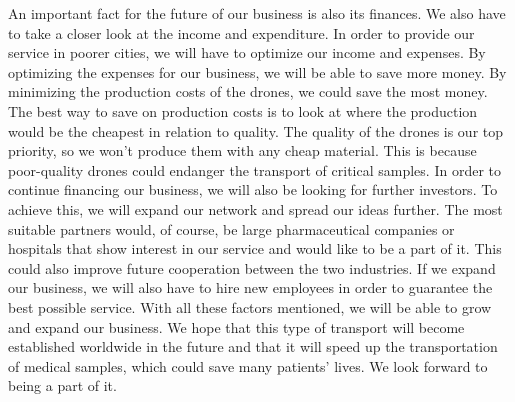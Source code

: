 An important fact for the future of our business is also its finances. We also have to take a closer look at the income and expenditure. In order to provide our service in poorer cities, we will have to optimize our income and expenses. By optimizing the expenses for our business, we will be able to save more money. By minimizing the production costs of the drones, we could save the most money. The best way to save on production costs is to look at where the production would be the cheapest in relation to quality. The quality of the drones is our top priority, so we won't produce them with any cheap material. This is because poor-quality drones could endanger the transport of critical samples. In order to continue financing our business, we will also be looking for further investors. To achieve this, we will expand our network and spread our ideas further. The most suitable partners would, of course, be large pharmaceutical companies or hospitals that show interest in our service and would like to be a part of it. This could also improve future cooperation between the two industries. If we expand our business, we will also have to hire new employees in order to guarantee the best possible service.
\newline
With all these factors mentioned, we will be able to grow and expand our business. We hope that this type of transport will become established worldwide in the future and that it will speed up the transportation of medical samples, which could save many patients' lives. We look forward to being a part of it.

